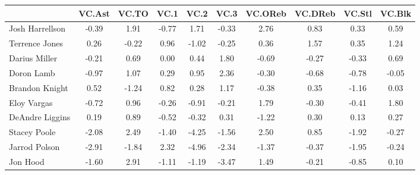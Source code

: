 \documentclass[10pt,letterpaper]{article}
\begin{document}
\begin{table}[ht]
\begin{center}
\begin{tabular}{lccccccccc}
  \hline
 & VC.Ast & VC.TO & VC.1 & VC.2 & VC.3 & VC.OReb & VC.DReb & VC.Stl & VC.Blk \\ 
  \hline
Josh Harrellson & -0.39 & 1.91 & -0.77 & 1.71 & -0.33 & 2.76 & 0.83 & 0.33 & 0.59 \\ 
  Terrence Jones & 0.26 & -0.22 & 0.96 & -1.02 & -0.25 & 0.36 & 1.57 & 0.35 & 1.24 \\ 
  Darius Miller & -0.21 & 0.69 & 0.00 & 0.44 & 1.80 & -0.69 & -0.27 & -0.33 & 0.69 \\ 
  Doron Lamb & -0.97 & 1.07 & 0.29 & 0.95 & 2.36 & -0.30 & -0.68 & -0.78 & -0.05 \\ 
  Brandon Knight & 0.52 & -1.24 & 0.82 & 0.28 & 1.17 & -0.38 & 0.35 & -1.16 & 0.03 \\ 
  Eloy Vargas & -0.72 & 0.96 & -0.26 & -0.91 & -0.21 & 1.79 & -0.30 & -0.41 & 1.80 \\ 
  DeAndre Liggins & 0.19 & 0.89 & -0.52 & -0.32 & 0.31 & -1.22 & 0.30 & 0.13 & 0.27 \\ 
  Stacey Poole & -2.08 & 2.49 & -1.40 & -4.25 & -1.56 & 2.50 & 0.85 & -1.92 & -0.27 \\ 
  Jarrod Polson & -2.91 & -1.84 & 2.32 & -4.96 & -2.34 & -1.37 & -0.37 & -1.95 & -0.24 \\ 
  Jon Hood & -1.60 & 2.91 & -1.11 & -1.19 & -3.47 & 1.49 & -0.21 & -0.85 & 0.10 \\ 
   \hline
\end{tabular}
\end{center}
\end{table}
\end{document}

